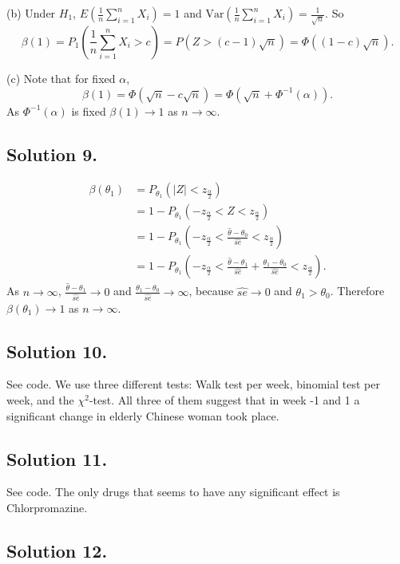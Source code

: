 (b) Under $H_1$, $E(\frac{1}{n} \sum_{i = 1}^n X_i) = 1$ and $\mathrm{Var}(\frac{1}{n} \sum_{i = 1}^n X_i) = \frac{1}{\sqrt{n}}$.
So
$$
\beta(1) = P_1\left(\frac{1}{n} \sum_{i = 1}^n X_i > c\right) = P(Z > (c - 1)\sqrt{n}) = \Phi((1 - c)\sqrt{n}).
$$

(c) Note that for fixed $\alpha$,
$$
\beta(1) = \Phi(\sqrt{n} - c\sqrt{n}) = \Phi(\sqrt{n} + \Phi^{-1}(\alpha)).
$$
As $\Phi^{-1}(\alpha)$ is fixed $\beta(1) \to 1$ as $n \to \infty$.


\subsection*{Solution 9.}
\begin{equation*}
\begin{split}
\beta(\theta_1) &= P_{\theta_1}(|Z| < z_{\frac{\alpha}{2}}) \\
    &= 1 - P_{\theta_1}(-z_{\frac{\alpha}{2}} < Z < z_{\frac{\alpha}{2}}) \\
    &= 1 - P_{\theta_1}\left(-z_{\frac{\alpha}{2}} < \frac{\hat{\theta} - \theta_0}{\hat{se}} < z_{\frac{\alpha}{2}}\right) \\
    &= 1 - P_{\theta_1}\left(-z_{\frac{\alpha}{2}} < \frac{\hat{\theta} - \theta_1}{\hat{se}} + \frac{\theta_1 - \theta_0}{\hat{se}} < z_{\frac{\alpha}{2}}\right).
\end{split}
\end{equation*}
As $n \to \infty$, $\frac{\hat{\theta} - \theta_1}{\hat{se}} \to 0$ and $\frac{\theta_1 - \theta_0}{\hat{se}} \to \infty$, because $\hat{se} \to 0$ and $\theta_1 > \theta_0$.
Therefore $\beta(\theta_1) \to 1$ as $n \to \infty$.


\subsection*{Solution 10.}

See code.
We use three different tests: Walk test per week, binomial test per week, and the $\chi^2$-test.
All three of them suggest that in week -1 and 1 a significant change in elderly Chinese woman took place.


\subsection*{Solution 11.}

See code.
The only drugs that seems to have any significant effect is Chlorpromazine.


\subsection*{Solution 12.}

